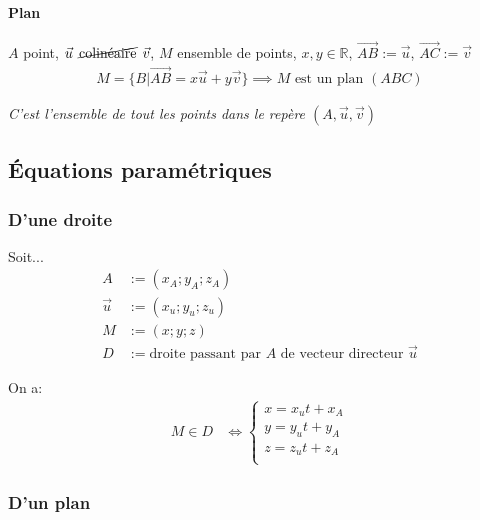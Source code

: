\documentclass{article}
\newcommand{\R}{\mathds{R}}
\newcommand{\vect}[1]{\overrightarrow{#1}}
\begin{document}
\paragraph{Plan}
$A$ point, $\vec u \:\:\cancel{\text{colinéaire}}\:\:\vec v$, $M$ ensemble de points, $x, y \in \R$, $\vect{AB} := \vec u$, $\vect{AC} := \vec v$
\begin{align*}
	M = \{B|\vect{AB} = x\vec u + y\vec v \} \implies \text{$M$ est un plan $(ABC)$}
\end{align*}

\emph{C'est l'ensemble de tout les points dans le repère $(A, \vec u, \vec v)$} 


\subsection{Équations paramétriques}

\subsubsection{D'une droite}

Soit...
\begin{equation*}
    \begin{split}
        A &:= (x_A; y_A; z_A) \\
        \vec u &:= (x_u; y_u; z_u) \\
        M &:= (x; y; z) \\
        D &:= \text{droite passant par $A$ de vecteur directeur $\vec u$}
    \end{split}
\end{equation*}

On a:
\begin{equation*}
    \begin{split}
        M \in D &\iff
        \begin{cases}
            x = x_ut + x_A \\
            y = y_ut + y_A \\
            z = z_ut + z_A \\
        \end{cases}
    \end{split}
\end{equation*}

\subsubsection{D'un plan}
\end{document}
